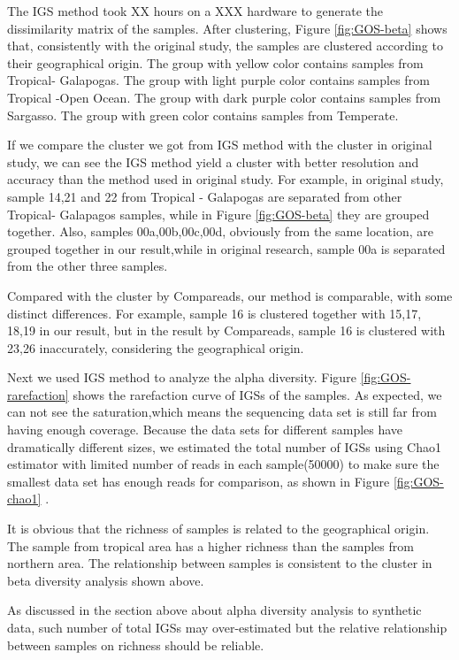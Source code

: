 The IGS method took XX hours on a XXX hardware to generate the dissimilarity 
matrix of the samples. After clustering, 
Figure \ref{fig:GOS-beta} shows that, consistently with the original study, 
the samples are clustered according to their 
geographical origin. The group with yellow color contains samples from 
Tropical- Galapogas. The group with light purple color
contains samples from Tropical -Open Ocean. The group with dark purple 
color contains samples from Sargasso. The group 
with green color contains samples from Temperate. 

If we compare the cluster we got from IGS method with the cluster in original 
study, we can see the IGS method yield a
cluster with better resolution and accuracy than the method used in original 
study. For example, in original study,
sample 14,21 and 22 from Tropical - Galapogas are separated from other 
Tropical- Galapagos samples, while in Figure \ref{fig:GOS-beta} 
they are grouped together. Also, samples 00a,00b,00c,00d, obviously from the 
same location, are grouped together in our result,while
in original research, sample 00a is separated from the other three samples.

Compared with the cluster by Compareads, our method is comparable, with some 
distinct differences. For example, sample 16 is clustered together with 15,17,
18,19 in our result, but in the result by Compareads, sample 16 is clustered 
with 23,26 inaccurately, considering the geographical origin.

Next we used IGS method to analyze the alpha diversity.
Figure \ref{fig:GOS-rarefaction} shows the rarefaction curve of IGSs of the samples.
As expected, we can not see the saturation,which means the sequencing data 
set is still far from having enough coverage. 
Because the data sets for different samples have dramatically different sizes, 
we estimated the total number of IGSs using Chao1 estimator with limited 
number of reads in each sample(50000) to make sure the smallest data set 
has enough reads for comparison, as shown in Figure \ref{fig:GOS-chao1} .

It is obvious that the richness of samples is related to the geographical 
origin. The sample from tropical area has a higher richness than
the samples from northern area. The relationship between samples is 
consistent to the cluster in beta diversity analysis shown above.

As discussed in the section above about alpha diversity analysis 
to synthetic data, such number of total IGSs may over-estimated but
the relative relationship between samples on richness should be reliable.

